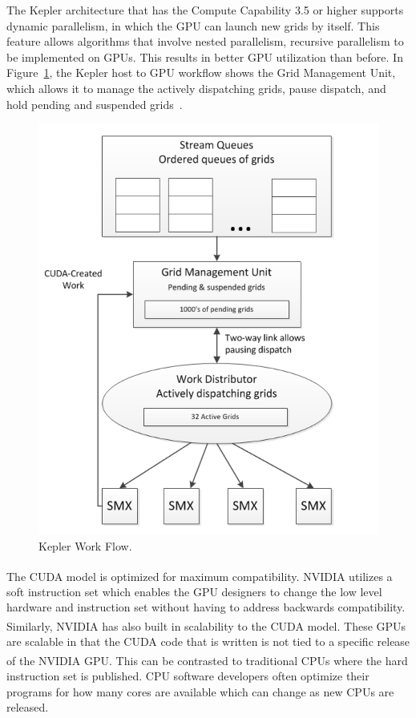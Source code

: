 The Kepler architecture that has the Compute Capability 3.5 or higher supports dynamic parallelism, in which the GPU can launch new grids by itself. This feature allows algorithms that involve nested parallelism, recursive parallelism to be implemented on GPUs. This results in better GPU utilization than before. In Figure~\ref{fig:gpu_execution_hl_overview}, the Kepler host to GPU workflow 
shows the Grid Management Unit, which allows it to manage the actively 
dispatching grids, pause dispatch, and hold pending and suspended grids~\cite{nvidia:12:gk110}.

\begin{figure} [H]
    \centering
    \vspace{0.5in}
    \includegraphics[scale=0.40]{Images/gpu_execution_hl_overview}
    \vspace{0.5in}
    \caption{Kepler Work Flow.}
    \label{fig:gpu_execution_hl_overview}
\end{figure}


The CUDA model is optimized for maximum compatibility.
NVIDIA\textsuperscript{\textregistered} utilizes a soft instruction
set which enables the GPU designers to change the low level hardware
and instruction set without having to address backwards compatibility.
Similarly, NVIDIA\textsuperscript{\textregistered} has also built in
scalability to the CUDA model.  These GPUs are scalable in that the
CUDA code that is written is not tied to a specific release of the
NVIDIA\textsuperscript{\textregistered} GPU.  This can be contrasted
to traditional CPUs where the hard instruction set is published.  CPU
software developers often optimize their programs for how many cores
are available which can change as new CPUs are released.

